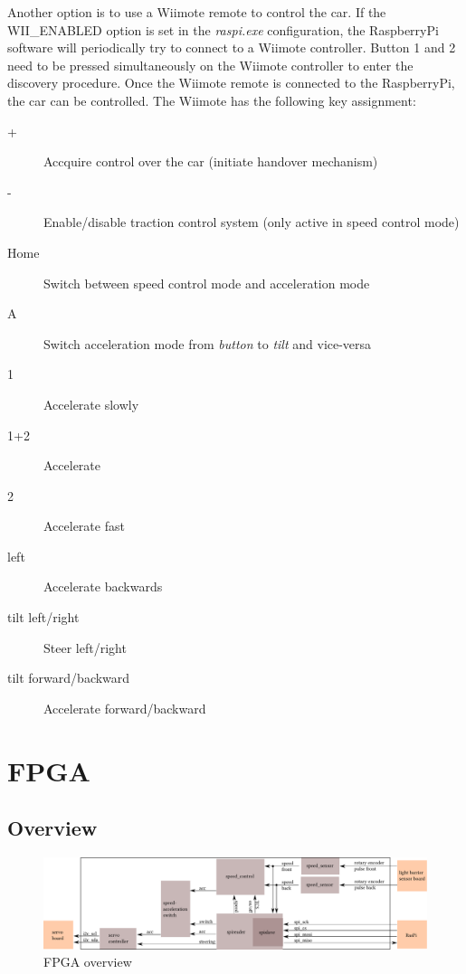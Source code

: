 \documentclass[a4paper
               ,10pt
               ,DIV=10 %
               ,BCOR=0.3cm
               ,pagesize %
               ,headings=small
               ,bibtotoc
               ]
               {scrartcl}
\begin{document}
Another option is to use a Wiimote remote to control the car. If the WII\_ENABLED option is set in the \textit{raspi.exe} configuration, the RaspberryPi software will periodically try to connect to a Wiimote controller.
Button 1 and 2 need to be pressed simultaneously on the Wiimote controller to enter the discovery procedure.
Once the Wiimote remote is connected to the RaspberryPi, the car can be controlled.
The Wiimote has the following key assignment:
\begin{description}
\item[+] Accquire control over the car (initiate handover mechanism)
\item[-] Enable/disable traction control system (only active in speed control mode)
\item[Home] Switch between speed control mode and acceleration mode
\item[A] Switch acceleration mode from \textit{button} to \textit{tilt} and vice-versa
\item[1] Accelerate slowly
\item[1+2] Accelerate
\item[2] Accelerate fast
\item[left] Accelerate backwards
\item[tilt left/right] Steer left/right
\item[tilt forward/backward] Accelerate forward/backward
\end{description}


\section{FPGA}

\subsection{Overview}

\begin{figure}[H]
\begin{center}
\includegraphics[width=\linewidth]{pic/fpga}
\caption{FPGA overview}
\label{figfpga}
\end{center}
\end{figure}
\end{document}
